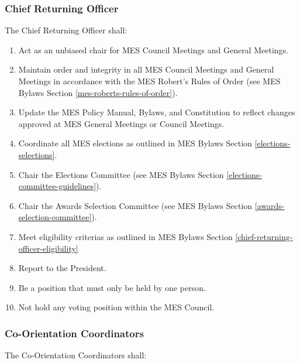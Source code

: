\subsubsection{Chief Returning Officer}
\label{chief-returning-officer}
The Chief Returning Officer shall:

\begin{enumerate}
 \item
  Act as an unbiased chair for MES Council Meetings and General Meetings.
 \item
  Maintain order and integrity in all MES Council Meetings and General Meetings in accordance with the MES Robert's Rules of Order (see MES Bylaws Section \ref{mes-roberts-rules-of-order}).
 \item
  Update the MES Policy Manual, Bylaws, and Constitution to reflect changes approved at MES General Meetings or Council Meetings.
 \item
  Coordinate all MES elections as outlined in MES Bylaws Section \ref{elections-selections}.
 \item
  Chair the Elections Committee (see MES Bylaws Section \ref{elections-committee-guidelines}).
 \item
  Chair the Awards Selection Committee (see MES Bylaws Section \ref{awards-selection-committee}).
 \item
  Meet eligibility criterias as outlined in MES Bylaws Section \ref{chief-returning-officer-eligibility}
 \item
  Report to the President.
 \item
  Be a position that must only be held by one person.
 \item
  Not hold any voting position within the MES Council.
\end{enumerate}

\subsubsection{Co-Orientation Coordinators}
\label{co-orientation-coordinators}
The Co-Orientation Coordinators shall:

